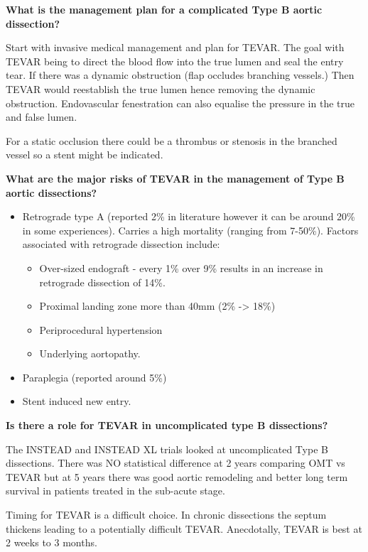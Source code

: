 \documentclass[
]{book}
\begin{document}
\textbf{What is the management plan for a complicated Type B aortic
dissection?}

Start with invasive medical management and plan for TEVAR. The goal with
TEVAR being to direct the blood flow into the true lumen and seal the
entry tear. If there was a dynamic obstruction (flap occludes branching
vessels.) Then TEVAR would reestablish the true lumen hence removing the
dynamic obstruction. Endovascular fenestration can also equalise the
pressure in the true and false lumen. \citep{lombardiSTABLEIIClinical2020}

For a static occlusion there could be a thrombus or stenosis in the
branched vessel so a stent might be indicated.

\textbf{What are the major risks of TEVAR in the management of Type B aortic
dissections?}

\begin{itemize}
\item
  Retrograde type A (reported 2\% in literature however it can be
  around 20\% in some experiences). Carries a high mortality (ranging
  from 7-50\%). Factors associated with retrograde dissection include:

  \begin{itemize}
  \item
    Over-sized endograft - every 1\% over 9\% results in an increase
    in retrograde dissection of 14\%.\citep{canaud2014}
  \item
    Proximal landing zone more than 40mm (2\% -\textgreater{} 18\%)
  \item
    Periprocedural hypertension
  \item
    Underlying aortopathy.\citep{tjaden2018}
  \end{itemize}
\item
  Paraplegia (reported around 5\%)
\item
  Stent induced new entry.
\end{itemize}

\textbf{Is there a role for TEVAR in uncomplicated type B dissections?}

The INSTEAD and INSTEAD XL trials looked at uncomplicated Type B
dissections. There was NO statistical difference at 2 years comparing
OMT vs TEVAR but at 5 years there was good aortic remodeling and better
long term survival in patients treated in the sub-acute stage.

Timing for TEVAR is a difficult choice. In chronic dissections the
septum thickens leading to a potentially difficult TEVAR. Anecdotally,
TEVAR is best at 2 weeks to 3 months.
\end{document}

